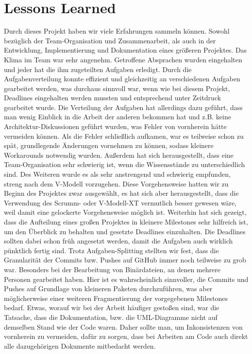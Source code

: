\documentclass[oneside,a4paper,titlepage]{scrartcl}              %
\begin{document}
\newpage

\section{Lessons Learned}
Durch dieses Projekt haben wir viele Erfahrungen sammeln können. Sowohl bezüglich der Team-Organisation und Zusammenarbeit, als auch in der Entwicklung, Implementierung und Dokumentation eines größeren Projektes.\newline
Das Klima im Team war sehr angenehm. Getroffene Absprachen wurden eingehalten und jeder hat die ihm zugeteilten Aufgaben erledigt.\newline
Durch die Aufgabenverteilung konnte effizient und gleichzeitig an verschiedenen Aufgaben gearbeitet werden, was durchaus sinnvoll war, wenn wie bei diesem Projekt, Deadlines eingehalten werden mussten und entsprechend unter Zeitdruck gearbeitet wurde.\newline
Die Verteilung der Aufgaben hat allerdings dazu geführt, dass man wenig Einblick in die Arbeit der anderen bekommen hat und z.B. keine Architektur-Diskussionen geführt wurden, was Fehler von vornherein hätte vermeiden können. Als die Fehler schließlich aufkamen, war es teilweise schon zu spät, grundlegende Änderungen vornehmen zu können, sodass kleinere Workarounds notwendig wurden.\newline
Außerdem hat sich herausgestellt, dass eine Team-Organisation sehr schwierig ist, wenn die Wissensstände zu unterschiedlich sind.\newline
Des Weiteren wurde es als sehr anstrengend und schwierig empfunden, streng nach dem V-Modell vorzugehen. Diese Vorgehensweise hatten wir zu Beginn des Projektes zwar ausgewählt, es hat sich aber herausgestellt, dass die Verwendung des Scrumm- oder V-Modell-XT vermutlich besser gewesen wäre, weil damit eine gelockerte Vorgehensweise möglich ist.\newline
Weiterhin hat sich gezeigt, dass die Aufteilung eines großen Projektes in kleinere Milestones sehr hilfreich ist, um den Überblick zu behalten und gesetzte Deadlines einzuhalten. Die Deadlines sollten dabei schon früh angesetzt werden, damit die Aufgaben auch wirklich pünktlich fertig sind.\newline
Trotz Aufgaben-Splitting stellten wir fest, dass die Granularität der Commits bzw. Pushes auf GitHub immer noch teilweise zu grob war. Besonders bei der Bearbeitung von Binärdateien, an denen mehrere Personen gearbeitet haben. Hier ist es wahrscheinlich sinnvoller, die Commits und Pushes auf Grundlage von kleineren Paketen durchzuführen, was aber möglicherweise einer weiteren Fragmentierung der vorgegebenen Milestones bedarf.\newline
Etwas, worauf wir bei der Arbeit häufiger gestoßen sind, war die Tatsache, dass die Dokumentation, bzw. die UML-Diagramme nicht auf demselben Stand wie der Code waren. Daher sollte man, um Inkonsistenzen von vornherein zu vermeiden, dafür zu sorgen, dass bei Arbeiten am Code auch direkt alle dazugehörigen Dokumente mitbedacht werden.
\end{document}
